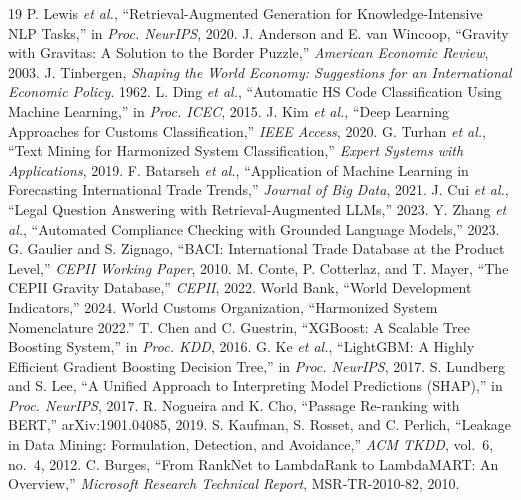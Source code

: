 \documentclass[conference]{IEEEtran}
\begin{document}
\begin{thebibliography}{19}
 P. Lewis \textit{et al.}, ``Retrieval-Augmented
Generation for Knowledge-Intensive NLP Tasks,'' in \textit{Proc. NeurIPS},
2020.
 J. Anderson and E. van Wincoop, ``Gravity with
Gravitas: A Solution to the Border Puzzle,'' \textit{American Economic
Review}, 2003.
 J. Tinbergen, \textit{Shaping the World Economy:
Suggestions for an International Economic Policy}. 1962.
 L. Ding \textit{et al.}, ``Automatic HS Code
Classification Using Machine Learning,'' in \textit{Proc. ICEC}, 2015.
 J. Kim \textit{et al.}, ``Deep Learning Approaches for
Customs Classification,'' \textit{IEEE Access}, 2020.
 G. Turhan \textit{et al.}, ``Text Mining for
Harmonized System Classification,'' \textit{Expert Systems with
Applications}, 2019.
 F. Batarseh \textit{et al.}, ``Application of
Machine Learning in Forecasting International Trade Trends,''
\textit{Journal of Big Data}, 2021.
 J. Cui \textit{et al.}, ``Legal Question Answering with
Retrieval-Augmented LLMs,'' 2023.
 Y. Zhang \textit{et al.}, ``Automated Compliance
Checking with Grounded Language Models,'' 2023.
 G. Gaulier and S. Zignago, ``BACI: International Trade
Database at the Product Level,'' \textit{CEPII Working Paper}, 2010.
 M. Conte, P. Cotterlaz, and T. Mayer, ``The CEPII
Gravity Database,'' \textit{CEPII}, 2022.
 World Bank, ``World Development Indicators,'' 2024.
 World Customs Organization, ``Harmonized System
Nomenclature 2022.''
 T. Chen and C. Guestrin, ``XGBoost: A Scalable Tree
Boosting System,'' in \textit{Proc. KDD}, 2016.
 G. Ke \textit{et al.}, ``LightGBM: A Highly
Efficient Gradient Boosting Decision Tree,'' in \textit{Proc. NeurIPS},
2017.
 S. Lundberg and S. Lee, ``A Unified Approach to
Interpreting Model Predictions (SHAP),'' in \textit{Proc. NeurIPS}, 2017.
 R. Nogueira and K. Cho, ``Passage Re-ranking with
BERT,'' arXiv:1901.04085, 2019.
 S. Kaufman, S. Rosset, and C. Perlich, ``Leakage in
Data Mining: Formulation, Detection, and Avoidance,'' \textit{ACM TKDD},
vol.~6, no.~4, 2012.
 C. Burges, ``From RankNet to LambdaRank to
LambdaMART: An Overview,'' \textit{Microsoft Research Technical Report},
MSR-TR-2010-82, 2010.
\end{thebibliography}
\end{document}
